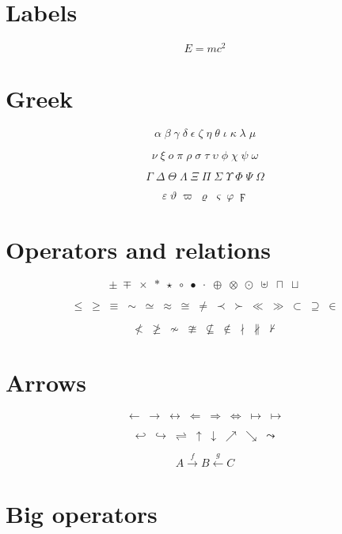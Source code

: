 \section{Labels}

\begin{equation}
  E = mc^2 \label{eq:mass-energy}
\end{equation}

\section{Greek}

\[ \alpha \; \beta \; \gamma \; \delta \; \epsilon \; \zeta \; \eta \; \theta \; \iota \; \kappa \; \lambda \; \mu \]

\[ \nu \; \xi \; o \; \pi \; \rho \; \sigma \; \tau \; \upsilon \; \phi \; \chi \; \psi \; \omega \]

\[ \Gamma \; \Delta \; \Theta \; \Lambda \; \Xi \; \Pi \; \Sigma \; \Upsilon \; \Phi \; \Psi \; \Omega \]

\[ \varepsilon \; \vartheta \; \varpi \; \varrho \; \varsigma \; \varphi \; \digamma \]

\section{Operators and relations}

\[ \pm \; \mp \; \times \; \ast \; \star \; \circ \; \bullet \; \cdot \; \oplus \; \otimes \; \odot \; \uplus \; \sqcap \; \sqcup \]

\[ \leq \; \geq \; \equiv \; \sim \; \simeq \; \approx \; \cong \; \neq \; \prec \; \succ \; \ll \; \gg \; \subset \; \supseteq \; \in \]

\[ \nless \; \ngeq \; \nsim \; \ncong \; \nsubseteq \; \notin \; \nmid \; \nparallel \; \nvdash \]

\section{Arrows}

\[ \leftarrow \; \rightarrow \; \leftrightarrow \; \Leftarrow \; \Rightarrow \; \Leftrightarrow \; \mapsto \; \longmapsto \]

\[ \hookleftarrow \; \hookrightarrow \; \rightleftharpoons \; \uparrow \; \downarrow \; \nearrow \; \searrow \; \leadsto \]

\[ A \xrightarrow{\;f\;} B \xleftarrow{\;g\;} C \]

\section{Big operators}

